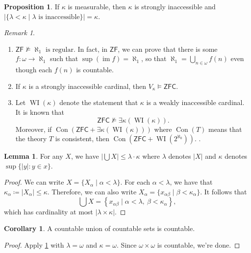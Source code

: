 \documentclass[10pt,letterpaper,cm]{nupset}
\theoremstyle{definition}
\theoremstyle{theorem}
\newtheorem{lemma}[definition]{Lemma}
\newtheorem{prop}[definition]{Proposition}
\newtheorem{corollary}[definition]{Corollary}
\theoremstyle{remark}
\newtheorem{remark}[definition]{Remark}
\newcommand{\1}{\mathbf{1}}
\newcommand{\0}{\vec 0}
\newcommand{\zf}{\mathsf{ZF}}
\newcommand{\zfc}{\mathsf{ZFC}}
\DeclareMathOperator{\im}{im}
\DeclareMathOperator{\wi}{WI}
\DeclareMathOperator{\con}{Con}
\begin{document}
\begin{prop} 
 If $\kappa$ is measurable, then $\kappa$ is strongly inaccessible and $\lvert{\{\lambda < \kappa \mid \lambda \text{ is inaccessible}\}}\rvert = \kappa$.
\end{prop}

\begin{remark} $ $
\begin{enumerate}
\item $\zf \nvDash \aleph_1 \text{ is regular}$. In fact, in $\zf$, we can prove that there is some $f: \omega \to \aleph_1$ such that $\sup(\im{f}) = \aleph_1$, so that $\aleph_1 = \bigcup_{n \in \omega} f(n)$ even though each $f(n)$ is countable. 
\item If $\kappa$ is a strongly inaccessible cardinal, then $V_{\kappa} \models \zfc$.
\item  Let $\wi(\kappa)$ denote the statement that $\kappa$ is a weakly inaccessible cardinal. It is known that $$\zfc \nvDash \exists{\kappa}(\wi(\kappa)).$$ Moreover, if $\con(\zfc + \exists{\kappa}(\wi(\kappa)))$ where $\con(T)$ means that the theory $T$ is consistent, then $\con(\zfc + \wi(2^{\aleph_0}))$.     . 
\end{enumerate}
\end{remark}

\begin{lemma}\label{card-prop}
For any $X$, we have $\lvert{\bigcup{X}}\rvert \leq \lambda \cdot \kappa$ where $\lambda$ denotes $\lvert{X}\rvert $ and $\kappa$ denotes $\sup\{\lvert{y}\rvert : y\in x\}$.
\end{lemma}
\begin{proof}
We can write $X=\{X_{\alpha} \mid \alpha <\lambda\}$. For each $\alpha <\lambda$, we have that $\kappa_{\alpha} \coloneqq \lvert{X_{\alpha}}\rvert \leq \kappa$. Therefore, we can also write $X_{\alpha} = \{x_{\alpha{\beta}} \mid \beta < \kappa_{\alpha}\}$. It follows that $$\bigcup{X} =\left\{ x_{\alpha{\beta}} \mid \alpha <\lambda, \ \beta < \kappa_{\alpha}\right\},   $$ which has cardinality at most $\lvert{\lambda \times \kappa}\rvert$.
\end{proof}

\begin{corollary}
A countable union of countable sets is countable.
\end{corollary}
\begin{proof}
Apply \cref{card-prop} with $\lambda =\omega$ and $\kappa = \omega$. Since $\omega \times \omega$ is countable, we're done.
\end{proof}
\end{document}
